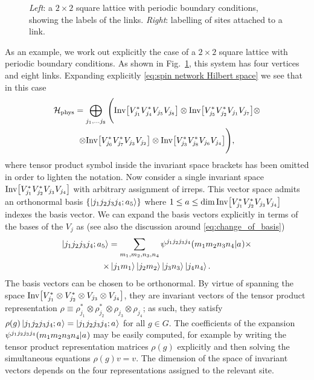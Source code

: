 \bigbreak

\begin{figure}[t]
    \centering
    
    \caption[Periodic square $2 \times 2$ lattice]{\emph{Left}: a $2\times 2$ square lattice with periodic boundary conditions, showing the labels of the links.
        \emph{Right}: labelling of sites attached to a link.}
    \label{fig:periodic plaquette}
\end{figure}

As an example, we work out explicitly the case of a $2\times 2$ square lattice with periodic boundary conditions.
As shown in Fig.~\ref{fig:periodic plaquette}, this system has four vertices and eight links.
Expanding explicitly \eqref{eq:spin network Hilbert space} we see that in this case
\begin{multline}
    \HilbertPhys = \bigoplus_{j_1, \ldots j_8} \Bigg(
            \InvSpace{1}{4}{5}{8} \otimes
            \InvSpace{5}{2}{1}{7} \otimes \\ \otimes
            \InvSpace{6}{7}{3}{2} \otimes
            \InvSpace{3}{8}{6}{4}
        \Bigg),
\end{multline}
where tensor product symbol inside the invariant space brackets has been omitted in order to lighten the notation.
Now consider a single invariant space $\InvSpace{1}{2}{3}{4}$ with arbitrary assignment of irreps.
This vector space admits an orthonormal basis $\{\ket{j_{1} j_{2} j_{3} j_{4}; a_{5}}\}$ where $1 \leq a \leq \dim \InvSpace{1}{2}{3}{4}$ indexes the basis vector.
We can expand the basis vectors explicitly in terms of the bases of the $V_j$ as (see also the discussion around \eqref{eq:change_of_basis})
\begin{multline}
    \ket{j_{1} j_{2} j_{3} j_{4}; a_{5}}
    = \sum_{m_1, m_2, n_3, n_4} \psi^{ j_{1} j_{2} j_{3} j_{4} }( m_{1} m_{2} n_{3} n_{4} | a_{} ) \times \\
        \times \ket{j_{1} m_{1}} \ket{j_{2} m_{2}} \ket{j_{3} n_{3}} \ket{j_{4} n_{4}}.
    \label{eq:invariant states at a site}
\end{multline}
The basis vectors can be chosen to be orthonormal.
By virtue of spanning the space $\mathrm{Inv}\bqty{V_{j_1}^* \otimes V_{j_2}^* \otimes V_{j_3} \otimes V_{j_4}}$, they are invariant vectors of the tensor product representation $\rho \equiv \rho_{j_1}^* \otimes \rho_{j_2}^* \otimes \rho_{j_3} \otimes \rho_{j_4}$; as such, they satisfy $\rho(g) \ket{j_{1} j_{2} j_{3} j_{4}; a_{}} = \ket{j_{1} j_{2} j_{3} j_{4}; a_{}}$ for all $g \in G$.
The coefficients of the expansion $\psi^{ j_{1} j_{2} j_{3} j_{4} }( m_{1} m_{2} n_{3} n_{4} | a_{} )$ may be easily computed, for example by writing the tensor product representation matrices $\rho(g)$ explicitly and then solving the simultaneous equations $\rho(g) v = v$.
The dimension of the space of invariant vectors depends on the four representations assigned to the relevant site.

